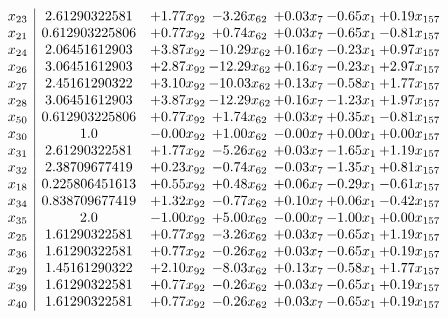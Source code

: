 \documentclass[8pt]{article}
\begin{document}
\[\begin{array}{c| c c@{\hskip 2pt} c@{\hskip 2pt} c@{\hskip 2pt} c@{\hskip 2pt} c@{\hskip 2pt} }
 x_{23}   &  2.61290322581 & +  1.77 x_{92} & -3.26 x_{62} & +  0.03 x_{7} & -0.65 x_{1} & +  0.19 x_{157}\\
 x_{21}   &  0.612903225806 & +  0.77 x_{92} & +  0.74 x_{62} & +  0.03 x_{7} & -0.65 x_{1} & -0.81 x_{157}\\
 x_{24}   &  2.06451612903 & +  3.87 x_{92} & -10.29 x_{62} & +  0.16 x_{7} & -0.23 x_{1} & +  0.97 x_{157}\\
 x_{26}   &  3.06451612903 & +  2.87 x_{92} & -12.29 x_{62} & +  0.16 x_{7} & -0.23 x_{1} & +  2.97 x_{157}\\
 x_{27}   &  2.45161290322 & +  3.10 x_{92} & -10.03 x_{62} & +  0.13 x_{7} & -0.58 x_{1} & +  1.77 x_{157}\\
 x_{28}   &  3.06451612903 & +  3.87 x_{92} & -12.29 x_{62} & +  0.16 x_{7} & -1.23 x_{1} & +  1.97 x_{157}\\
 x_{50}   &  0.612903225806 & +  0.77 x_{92} & +  1.74 x_{62} & +  0.03 x_{7} & +  0.35 x_{1} & -0.81 x_{157}\\
 x_{30}   &  1.0 & -0.00 x_{92} & +  1.00 x_{62} & -0.00 x_{7} & +  0.00 x_{1} & +  0.00 x_{157}\\
 x_{31}   &  2.61290322581 & +  1.77 x_{92} & -5.26 x_{62} & +  0.03 x_{7} & -1.65 x_{1} & +  1.19 x_{157}\\
 x_{32}   &  2.38709677419 & +  0.23 x_{92} & -0.74 x_{62} & -0.03 x_{7} & -1.35 x_{1} & +  0.81 x_{157}\\
 x_{18}   &  0.225806451613 & +  0.55 x_{92} & +  0.48 x_{62} & +  0.06 x_{7} & -0.29 x_{1} & -0.61 x_{157}\\
 x_{34}   &  0.838709677419 & +  1.32 x_{92} & -0.77 x_{62} & +  0.10 x_{7} & +  0.06 x_{1} & -0.42 x_{157}\\
 x_{35}   &  2.0 & -1.00 x_{92} & +  5.00 x_{62} & -0.00 x_{7} & -1.00 x_{1} & +  0.00 x_{157}\\
 x_{25}   &  1.61290322581 & +  0.77 x_{92} & -3.26 x_{62} & +  0.03 x_{7} & -0.65 x_{1} & +  1.19 x_{157}\\
 x_{36}   &  1.61290322581 & +  0.77 x_{92} & -0.26 x_{62} & +  0.03 x_{7} & -0.65 x_{1} & +  0.19 x_{157}\\
 x_{29}   &  1.45161290322 & +  2.10 x_{92} & -8.03 x_{62} & +  0.13 x_{7} & -0.58 x_{1} & +  1.77 x_{157}\\
 x_{39}   &  1.61290322581 & +  0.77 x_{92} & -0.26 x_{62} & +  0.03 x_{7} & -0.65 x_{1} & +  0.19 x_{157}\\
 x_{40}   &  1.61290322581 & +  0.77 x_{92} & -0.26 x_{62} & +  0.03 x_{7} & -0.65 x_{1} & +  0.19 x_{157}\\

\end{array}\]
\end{document}
